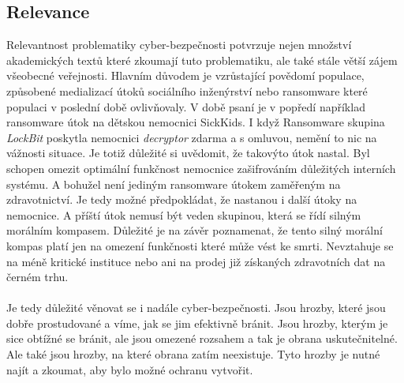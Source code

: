 \paragraph{}



\subsection{Relevance}
Relevantnost problematiky cyber-bezpečnosti potvrzuje nejen množství akademických textů které zkoumají tuto problematiku, ale také stále větší zájem všeobecné veřejnosti.
Hlavním důvodem je vzrůstající povědomí populace, způsobené medializací útoků sociálního inženýrství nebo ransomware které populaci v poslední době ovlivňovaly.
V době psaní je v popředí například ransomware útok na dětskou nemocnici SickKids.\cite{bleep_sickkids_ransom}
I když Ransomware skupina \textit{LockBit} poskytla nemocnici \textit{decryptor} zdarma a s omluvou, nemění to nic na vážnosti situace.
Je totiž důležité si uvědomit, že takovýto útok nastal.
Byl schopen omezit optimální funkčnost nemocnice zašifrováním důležitých interních systému.
A bohužel není jediným ransomware útokem zaměřeným na zdravotnictví.
Je tedy možné předpokládat, že nastanou i další útoky na nemocnice.
A příští útok nemusí být veden skupinou, která se řídí silným morálním kompasem.
Důležité je na závěr poznamenat, že tento silný morální kompas platí jen na omezení funkčnosti které může vést ke smrti.
Nevztahuje se na méně kritické instituce nebo ani na prodej již získaných zdravotních dat na černém trhu.

\paragraph{}
Je tedy důležité věnovat se i nadále cyber-bezpečnosti.
Jsou hrozby, které jsou dobře prostudované a víme, jak se jim efektivně bránit.
Jsou hrozby, kterým je sice obtížné se bránit, ale jsou omezené rozsahem a tak je obrana uskutečnitelné.
Ale také jsou hrozby, na které obrana zatím neexistuje.
Tyto hrozby je nutné najít a zkoumat, aby bylo možné ochranu vytvořit.

